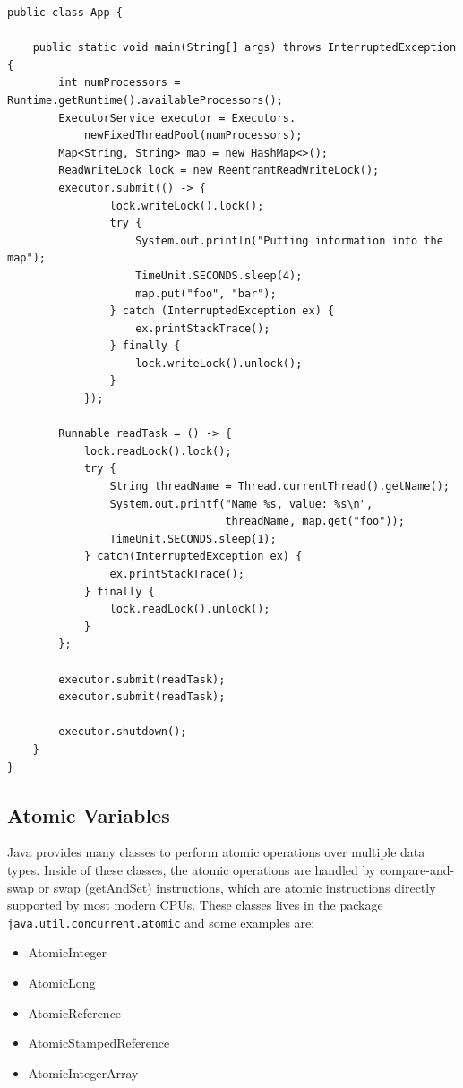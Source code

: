 \documentclass{latex/classes/thesis}
\begin{document}
\begin{enumerate}
\begin{lstlisting}
public class App {

    public static void main(String[] args) throws InterruptedException {
        int numProcessors = Runtime.getRuntime().availableProcessors();
        ExecutorService executor = Executors.
            newFixedThreadPool(numProcessors);
        Map<String, String> map = new HashMap<>();
        ReadWriteLock lock = new ReentrantReadWriteLock();
        executor.submit(() -> {
                lock.writeLock().lock();
                try {
                    System.out.println("Putting information into the map");
                    TimeUnit.SECONDS.sleep(4);
                    map.put("foo", "bar");
                } catch (InterruptedException ex) {
                    ex.printStackTrace();
                } finally {
                    lock.writeLock().unlock();
                }
            });

        Runnable readTask = () -> {
            lock.readLock().lock();
            try {
                String threadName = Thread.currentThread().getName();
                System.out.printf("Name %s, value: %s\n",
                                  threadName, map.get("foo"));
                TimeUnit.SECONDS.sleep(1);
            } catch(InterruptedException ex) {
                ex.printStackTrace();
            } finally {
                lock.readLock().unlock();
            }
        };

        executor.submit(readTask);
        executor.submit(readTask);

        executor.shutdown();
    }
}
\end{lstlisting}
\end{enumerate}

\subsection{Atomic Variables}
\label{sec:orga962e1b}

Java provides many classes to perform atomic operations over multiple data
types. Inside of these classes, the atomic operations are handled by
compare-and-swap or swap (getAndSet) instructions, which are atomic
instructions directly supported by most modern CPUs. These classes lives in
the package \texttt{java.util.concurrent.atomic} and some examples are:

\begin{itemize}
\item AtomicInteger
\item AtomicLong
\item AtomicReference
\item AtomicStampedReference
\item AtomicIntegerArray
\end{itemize}
\end{document}
